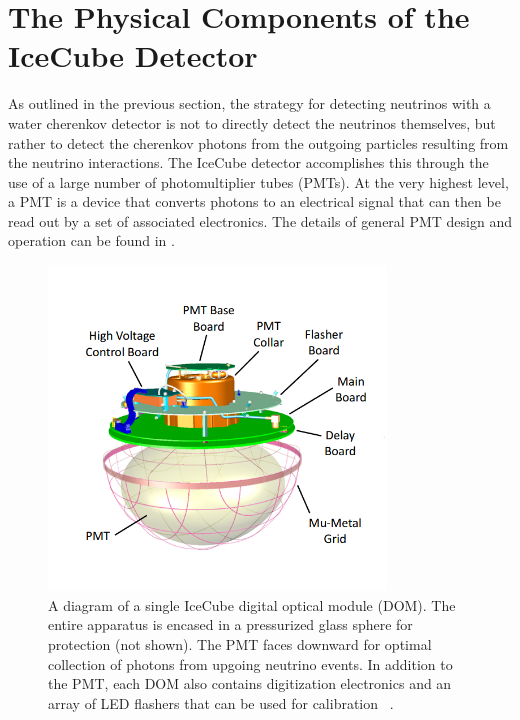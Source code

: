 \section{The Physical Components of the IceCube Detector}
As outlined in the previous section, the strategy for detecting neutrinos with a water cherenkov detector is not to directly detect the neutrinos themselves, but rather to detect the cherenkov photons from the outgoing particles resulting from the neutrino interactions. The IceCube detector accomplishes this through the use of a large number of photomultiplier tubes (PMTs). At the very highest level, a PMT is a device that converts photons to an electrical signal that can then be read out by a set of associated electronics. The details of general PMT design and operation can be found in \cite{tavernier_pmt}.

\begin{figure}[h]
\centering
\includegraphics[width=0.8\textwidth]{figs/DOM.png}
\caption{A diagram of a single IceCube digital optical module (DOM). The entire apparatus is encased in a pressurized glass sphere for protection (not shown). The PMT faces downward for optimal collection of photons from upgoing neutrino events. In addition to the PMT, each DOM also contains digitization electronics and an array of LED flashers that can be used for calibration ~\cite{det_paper}. }
\label{fig:DOM}
\end{figure}

